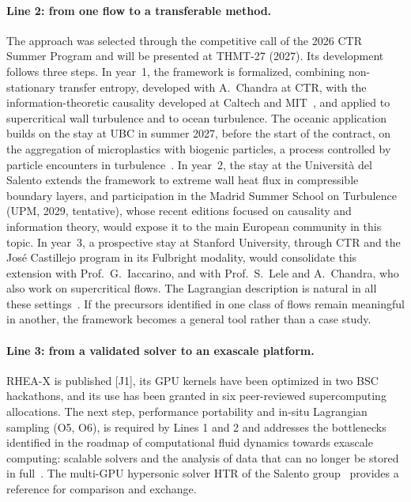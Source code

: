\documentclass[11pt]{article}
\begin{document}
\paragraph{Line 2: from one flow to a transferable method.} The approach was selected through
the competitive call of the 2026 CTR Summer Program and will be presented at THMT-27 (2027).
Its development follows three steps. In year~1, the framework is formalized, combining
non-stationary transfer entropy, developed with A.\ Chandra at CTR, with the
information-theoretic causality developed at Caltech and
MIT~\cite{LozanoDuranArranz2022,MartinezSanchez2024}, and applied to supercritical wall
turbulence and to ocean turbulence. The oceanic application builds on the stay at UBC in
summer 2027, before the start of the contract, on the aggregation of microplastics with
biogenic particles, a process controlled by particle encounters in
turbulence~\cite{Michels2018,vanSebille2020}. In year~2, the stay at the Universit\`a del
Salento extends the framework to extreme wall heat flux in compressible boundary layers, and
participation in the Madrid Summer School on Turbulence (UPM, 2029, tentative), whose recent
editions focused on causality and information theory, would expose it to the main European
community in this topic. In year~3, a prospective stay at Stanford University, through CTR and the Jos\'e Castillejo program
in its Fulbright modality,
would consolidate this extension with Prof.\ G.\ Iaccarino, and with Prof.\ S.\ Lele and A.\
Chandra, who also work on supercritical flows. The Lagrangian description is natural in all
these settings~\cite{Toschi2009}. If the precursors identified in one class of flows remain
meaningful in another, the framework becomes a general tool rather than a case study.

\paragraph{Line 3: from a validated solver to an exascale platform.} RHEA-X is published
[J1], its GPU kernels have been optimized in two BSC hackathons, and its use has been
granted in six peer-reviewed supercomputing allocations. The next step, performance
portability and in-situ Lagrangian sampling (O5, O6), is required by Lines 1 and 2 and
addresses the bottlenecks identified in the roadmap of computational fluid dynamics towards
exascale computing: scalable solvers and the analysis of data that can no longer be stored
in full~\cite{Slotnick2014}. The multi-GPU hypersonic solver HTR of the Salento
group~\cite{DiRenzo2020} provides a reference for comparison and exchange.
\end{document}
